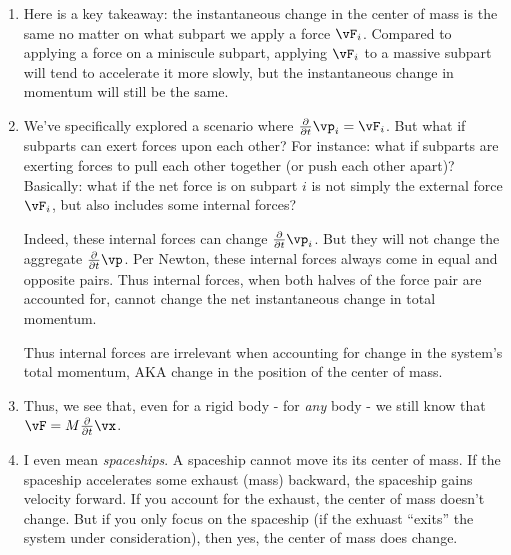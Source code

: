 \begin{enumerate}
  \item Here is a key takeaway: the instantaneous change in the center
  of mass is the same no matter on what subpart we apply a force
  $\vF_i$. Compared to applying a force on a miniscule subpart, applying
  $\vF_i$ to a massive subpart will tend to accelerate it more slowly,
  but the instantaneous change in momentum will still be the same.

  \item We've specifically explored a scenario where $\fpartial{t} \vp_i
  = \vF_i$. But what if subparts can exert forces upon each other? For
  instance: what if subparts are exerting forces to pull each other
  together (or push each other apart)? Basically: what if the net force
  is on subpart $i$ is not simply the external force $\vF_i$, but also
  includes some internal forces?

  Indeed, these internal forces can change $\fpartial{t} \vp_i$. But
  they will not change the aggregate $\fpartial{t} \vp$. Per Newton,
  these internal forces always come in equal and opposite pairs. Thus
  internal forces, when both halves of the force pair are accounted for,
  cannot change the net instantaneous change in total momentum.

  Thus internal forces are irrelevant when accounting for change in the
  system's total momentum, AKA change in the position of the center of
  mass.

  \item Thus, we see that, even for a rigid body - for \emph{any} body -
  we still know that $\vF = M \fpartial{t} \vx$.

  \item I even mean \emph{spaceships}. A spaceship cannot move its its
  center of mass. If the spaceship accelerates some exhaust (mass)
  backward, the spaceship gains velocity forward. If you account for the
  exhaust, the center of mass doesn't change. But if you only focus on
  the spaceship (if the exhuast ``exits'' the system under
  consideration), then yes, the center of  mass does change.
\end{enumerate}
